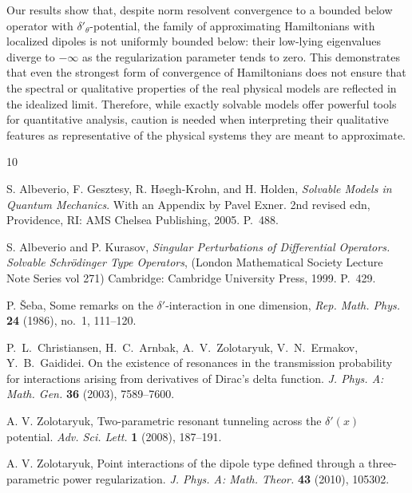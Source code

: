 \documentclass[reqno]{amsart}
\theoremstyle{definition}
\theoremstyle{remark}
\numberwithin{equation}{section}
\begin{document}
Our results show that, despite norm resolvent convergence to a bounded below operator with $\delta'_\theta$-potential, the family of approximating Hamiltonians with localized dipoles is not uniformly bounded below: their low-lying eigenvalues diverge to $-\infty$ as the regularization parameter tends to zero. This demonstrates that even the strongest form of convergence of Hamiltonians does not ensure that the spectral or qualitative properties of the real physical models are reflected in the idealized limit. Therefore, while exactly solvable models offer powerful tools for quantitative analysis, caution is needed when interpreting their qualitative features as representative of the physical
systems they are meant to approximate.

\begin{thebibliography}{10}

    S. Albeverio,  F. Gesztesy,  R. H{\o}egh-Krohn, and  H. Holden,
    {\it Solvable Models in Quantum Mechanics}. With an Appendix by Pavel Exner. 2nd revised edn,
    Providence, RI: AMS Chelsea Publishing, 2005. P.~488.

    S. Albeverio and P. Kurasov,
    {\it Singular Perturbations of Differential Operators.
         Solvable Schr\"{o}dinger Type Operators},
    (London Mathematical Society Lecture Note Series vol 271)
    Cambridge: Cambridge University Press, 1999. P.~429.

    P. \v{S}eba, {Some remarks on the $\delta'$-interaction in one dimension},
    \textit{Rep. Math. Phys.} \textbf{24} (1986), no.~1, 111--120.

    P.~L.~Christiansen,  H.~C.~Arnbak,  A.~V.~Zolotaryuk,  V.~N.~Ermakov, Y.~B.~Gaididei.
    On the existence of resonances in the transmission probability for interactions  arising from derivatives of Dirac’s delta function.
    \textit{J. Phys. A: Math. Gen.} {\bf 36} (2003), 7589--7600.

    A. V. Zolotaryuk,
    {Two-parametric resonant tunneling across the $\delta'(x)$ potential}.
    \textit{Adv. Sci. Lett.} {\bf 1} (2008), 187--191.

    A. V. Zolotaryuk,
    Point interactions of the dipole type defined through a three-parametric power regularization.
    \textit{J. Phys. A: Math. Theor.} {\bf 43} (2010), 105302.


\end{thebibliography}
\end{document}
